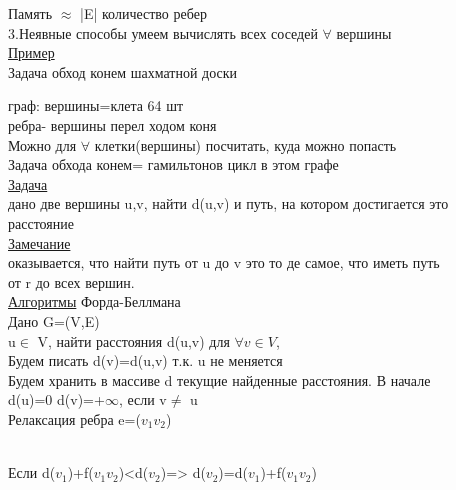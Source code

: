\documentclass{article}
\begin{document}
Память $\approx$ |E| количество ребер\\
3.Неявные способы умеем вычислять всех соседей $\forall$ вершины\\
\underline{Пример}\\
Задача обход конем шахматной доски\\
граф: вершины=клета 64 шт\\
ребра- вершины перел ходом коня\\
Можно для $\forall$ клетки(вершины) посчитать, куда можно попасть\\
Задача обхода конем= гамильтонов цикл в этом графе\\
\underline{Задача}\\
дано две вершины u,v, найти d(u,v) и путь, на котором достигается это\\
расстояние\\
\underline{Замечание}\\
оказывается, что найти путь от u до v это то де самое, что иметь путь\\
от r до всех вершин.\\
\underline{Алгоритмы} Форда-Беллмана\\
Дано G=(V,E)\\
u$\in$ V, найти расстояния d(u,v) для $\forall v\in V$,\\
Будем писать d(v)=d(u,v) т.к. u не меняется\\
Будем хранить в массиве d текущие найденные расстояния. В начале\\
d(u)=0 d(v)=+$\infty$, если v$\neq$ u\\
Релаксация ребра e=($v_1 v_2$)\\
\\
Если d($v_1$)+f($v_1v_2$)<d($v_2$)=> d($v_2$)=d($v_1$)+f($v_1v_2$)\\
\end{document}
